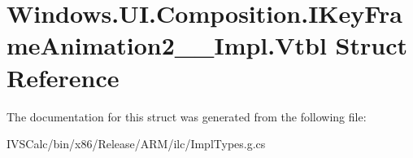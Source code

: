 \hypertarget{struct_windows_1_1_u_i_1_1_composition_1_1_i_key_frame_animation2_____impl_1_1_vtbl}{}\section{Windows.\+U\+I.\+Composition.\+I\+Key\+Frame\+Animation2\+\_\+\+\_\+\+Impl.\+Vtbl Struct Reference}
\label{struct_windows_1_1_u_i_1_1_composition_1_1_i_key_frame_animation2_____impl_1_1_vtbl}


The documentation for this struct was generated from the following file\+:\begin{DoxyCompactItemize}
\item 
I\+V\+S\+Calc/bin/x86/\+Release/\+A\+R\+M/ilc/Impl\+Types.\+g.\+cs\end{DoxyCompactItemize}
